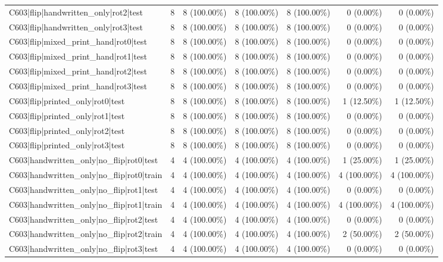 \begin{longtable}{>{\raggedright\arraybackslash}p{5cm}rrrrrr}
C603|flip|handwritten\_only|rot2|test & 8 & 8 (100.00\%) & 8 (100.00\%) & 8 (100.00\%) & 0 (0.00\%) & 0 (0.00\%) \\
C603|flip|handwritten\_only|rot3|test & 8 & 8 (100.00\%) & 8 (100.00\%) & 8 (100.00\%) & 0 (0.00\%) & 0 (0.00\%) \\
C603|flip|mixed\_print\_hand|rot0|test & 8 & 8 (100.00\%) & 8 (100.00\%) & 8 (100.00\%) & 0 (0.00\%) & 0 (0.00\%) \\
C603|flip|mixed\_print\_hand|rot1|test & 8 & 8 (100.00\%) & 8 (100.00\%) & 8 (100.00\%) & 0 (0.00\%) & 0 (0.00\%) \\
C603|flip|mixed\_print\_hand|rot2|test & 8 & 8 (100.00\%) & 8 (100.00\%) & 8 (100.00\%) & 0 (0.00\%) & 0 (0.00\%) \\
C603|flip|mixed\_print\_hand|rot3|test & 8 & 8 (100.00\%) & 8 (100.00\%) & 8 (100.00\%) & 0 (0.00\%) & 0 (0.00\%) \\
C603|flip|printed\_only|rot0|test & 8 & 8 (100.00\%) & 8 (100.00\%) & 8 (100.00\%) & 1 (12.50\%) & 1 (12.50\%) \\
C603|flip|printed\_only|rot1|test & 8 & 8 (100.00\%) & 8 (100.00\%) & 8 (100.00\%) & 0 (0.00\%) & 0 (0.00\%) \\
C603|flip|printed\_only|rot2|test & 8 & 8 (100.00\%) & 8 (100.00\%) & 8 (100.00\%) & 0 (0.00\%) & 0 (0.00\%) \\
C603|flip|printed\_only|rot3|test & 8 & 8 (100.00\%) & 8 (100.00\%) & 8 (100.00\%) & 0 (0.00\%) & 0 (0.00\%) \\
C603|handwritten\_only|no\_flip|rot0|test & 4 & 4 (100.00\%) & 4 (100.00\%) & 4 (100.00\%) & 1 (25.00\%) & 1 (25.00\%) \\
C603|handwritten\_only|no\_flip|rot0|train & 4 & 4 (100.00\%) & 4 (100.00\%) & 4 (100.00\%) & 4 (100.00\%) & 4 (100.00\%) \\
C603|handwritten\_only|no\_flip|rot1|test & 4 & 4 (100.00\%) & 4 (100.00\%) & 4 (100.00\%) & 0 (0.00\%) & 0 (0.00\%) \\
C603|handwritten\_only|no\_flip|rot1|train & 4 & 4 (100.00\%) & 4 (100.00\%) & 4 (100.00\%) & 4 (100.00\%) & 4 (100.00\%) \\
C603|handwritten\_only|no\_flip|rot2|test & 4 & 4 (100.00\%) & 4 (100.00\%) & 4 (100.00\%) & 0 (0.00\%) & 0 (0.00\%) \\
C603|handwritten\_only|no\_flip|rot2|train & 4 & 4 (100.00\%) & 4 (100.00\%) & 4 (100.00\%) & 2 (50.00\%) & 2 (50.00\%) \\
C603|handwritten\_only|no\_flip|rot3|test & 4 & 4 (100.00\%) & 4 (100.00\%) & 4 (100.00\%) & 0 (0.00\%) & 0 (0.00\%) \\

\end{longtable}
